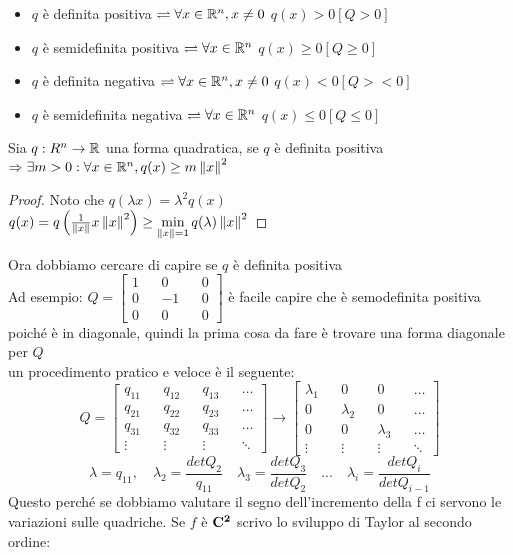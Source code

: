 \begin{itemize}
	\item $q$ è definita positiva $\rightleftharpoons \forall x\in \mathbb{R}^n, x\ne 0$ $q(x)>0 [Q>0]$
	\item $q$ è semidefinita positiva $\rightleftharpoons \forall x\in \mathbb{R}^n$ $q(x)\ge0 [Q\ge0]$
	\item $q$ è definita negativa $\rightleftharpoons \forall x\in \mathbb{R}^n, x\ne 0$ $q(x)<0 [Q><0]$
	\item $q$ è semidefinita negativa $\rightleftharpoons \forall x\in \mathbb{R}^n$ $q(x)\le0 [Q\le0]$
\end{itemize}
\proposition
Sia $q:R^n\rightarrow \mathbb{R}$ una forma quadratica, se $q$ è definita positiva $\Rightarrow \exists m>0: \forall x \in \mathbb{R}^n, q(x)\ge m\left\|x\right\|^2$
\begin{proof}
	Noto che $q(\lambda x)=\lambda^2q(x)$\\
	$q(x)=q\left(\frac{1}{\left\|x\right\|}x\left\|x\right\|^2\right)\ge\min\limits_{\left\|x\right\|=1}q(\lambda)\left\|x\right\|^2$
\end{proof}
Ora dobbiamo cercare di capire se $q$ è definita positiva\\
Ad esempio: $Q=\begin{bmatrix}1&&0&&0\\0&&-1&&0\\0&&0&&0\end{bmatrix}$ è facile capire che è semodefinita positiva poiché è in diagonale, quindi la prima cosa da fare è trovare una forma diagonale per $Q$\\
un procedimento pratico e veloce è il seguente:\\
$$Q=\begin{bmatrix}q_{11}&&q_{12}&&q_{13}&&\ldots\\q_{21}&&q_{22}&&q_{23}&&\ldots\\q_{31}&&q_{32}&&q_{33}&&\ldots\\\vdots&&\vdots&&\vdots&&\ddots\end{bmatrix}\rightarrow\begin{bmatrix}\lambda_{1}&&0&&0&&\ldots\\0&&\lambda_{2}&&0&&\ldots\\0&&0&&\lambda_{3}&&\ldots\\\vdots&&\vdots&&\vdots&&\ddots\end{bmatrix}$$
$$\lambda=q_{11},\quad\lambda_{2}=\frac{detQ_2}{q_11}\quad\lambda_{3}=\frac{detQ_3}{detQ_2}\quad ...\quad \lambda_{i}=\frac{detQ_i}{detQ_{i-1}}$$
Questo perché se dobbiamo valutare il segno dell'incremento della f ci servono le variazioni sulle quadriche. Se $f$ è $\mathbf{C^{2}}$ scrivo lo sviluppo di Taylor al secondo ordine:\\
